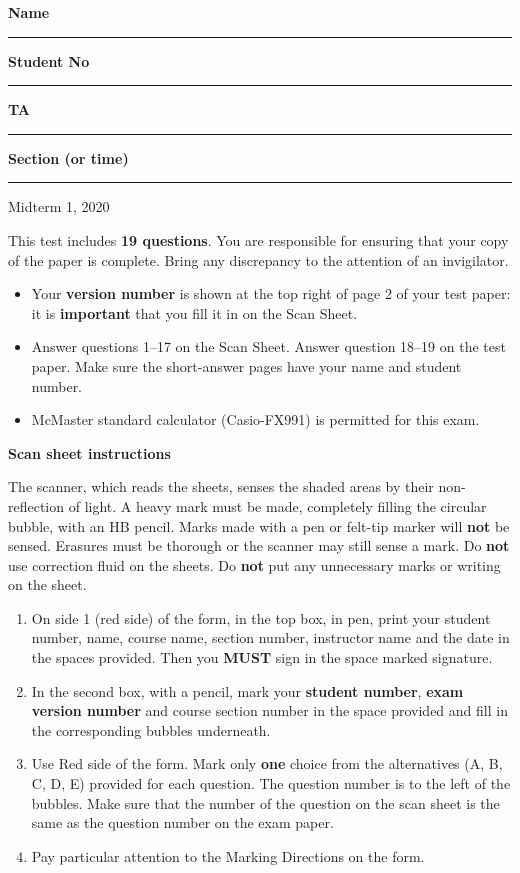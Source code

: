 \documentclass[12pt]{article}
\begin{document}
\noindent \textbf{Name} \rule{5cm}{1pt} \hfill \textbf{Student No} \rule{5cm}{1pt}

\noindent \textbf{TA} \rule{5cm}{1pt} \hfill \textbf{Section (or time)} \rule{5cm}{1pt}

\bigskip

{ \par}
{\centering Midterm 1, 2020 \par}

\parindent0pt

\vfill

This test includes {\bf 19 questions}. You are responsible for ensuring that your copy of the paper is complete. Bring any discrepancy to the attention of an invigilator. 

\vfill

\begin{itemize}
\item Your \textbf{version number} is shown at the top right of page 2 of your test paper: it is \textbf{important} that you fill it in on the Scan Sheet.
\item Answer questions 1--17 on the Scan Sheet. Answer question 18--19 on the test paper. Make sure the short-answer pages have your name and student number.
\item McMaster standard calculator (Casio-FX991) is permitted for this exam.
\end{itemize}

\vfill

\textbf{Scan sheet instructions}

\small{
The scanner, which reads the sheets, senses the shaded areas by their non-reflection of light. A heavy mark must be made, completely filling the circular bubble, with an HB pencil. Marks made with a pen or felt-tip marker will \textbf{not} be sensed. Erasures must be thorough or the scanner may still sense a mark. Do \textbf{not} use correction fluid on the sheets. Do \textbf{not} put any unnecessary marks or writing on the sheet.

\begin{enumerate}
\item On side 1 (red side) of the form, in the top box, in pen, print your student number, name, course name, section number, instructor name and the date in the spaces provided. Then you {\bf MUST} sign in the space marked signature.

\item In the second box, with a pencil, mark your {\bf student number}, {\bf exam version number} and course section number in the space provided and fill in the corresponding bubbles underneath.

\item Use Red side of the form. Mark only {\bf one} choice from the alternatives (A, B, C, D, E) provided for each question. The question number is to the left of the bubbles. Make sure that the number of the question on the scan sheet is the same as the question number on the exam paper.
\item  Pay particular attention to the Marking Directions on the form.
\end{enumerate}
}

\vfill
{ \par}
\end{document}
